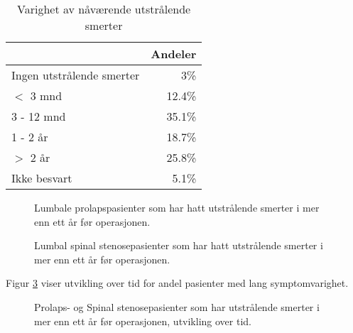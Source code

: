 \documentclass [norsk,a4paper,twoside]{article}\usepackage[]{graphicx}\usepackage[]{color}
\begin{document}
\begin{table}[ht]
\centering
\begin{tabular}{lr}
  \hline
 & Andeler \\ 
  \hline
Ingen utstrålende smerter & 3\% \\ 
  $<$ 3 mnd & 12.4\% \\ 
  3 - 12 mnd & 35.1\% \\ 
  1 - 2 år & 18.7\% \\ 
  $>$ 2 år & 25.8\% \\ 
  Ikke besvart & 5.1\% \\ 
   \hline
\end{tabular}
\caption{Varighet av nåværende utstrålende smerter} 
\label{tab:Utstr}
\end{table}

      
      




 


\begin{figure}[h] 
\caption{Lumbale prolapspasienter som har hatt utstrålende smerter i mer enn ett år før operasjonen.}
\label{fig:VarighSmerteUtstrAvdPro}
\end{figure}

\begin{figure}[h] 
\caption{Lumbal spinal stenosepasienter som har hatt utstrålende smerter i mer enn ett år før operasjonen.}
\label{fig:VarighSmerteUtstrAvdSS}
\end{figure}

Figur \ref{fig:VarighSmerteUtstrTid} viser utvikling over tid for andel pasienter med lang symptomvarighet. 

\begin{figure}[h] 
\caption{Prolaps- og Spinal stenosepasienter som har utstrålende smerter i mer enn ett år før operasjonen, utvikling over tid.}
\label{fig:VarighSmerteUtstrTid}
\end{figure}



\end{document}
